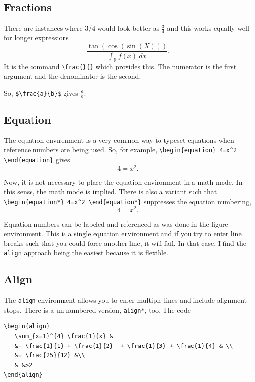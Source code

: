 \subsection*{Fractions}

There are instances where $3/4$ would look better as $\frac{3}{4}$ and this
works equally well for longer expressions $$ \frac{\tan\left(\cos\left(\sin (X)
    \right)\right)}{\int_{\mathbb{R}} f(x) ~ dx}.$$ It is the command
\verb!\frac{}{}! which provides this. The numerator is the first argument and
the denominator is the second.

So, \verb=$\frac{a}{b}$= gives $\frac{a}{b}$.

\subsection*{Equation}

The equation environment is a very common way to typeset equations
when reference numbers are being used. So, for example,
\verb!\begin{equation} 4=x^2 \end{equation}! gives
\begin{equation}
  4=x^2.
\end{equation}

Now, it is not necessary to place the equation environment in a math
mode. In this sense, the math mode is implied. There is also a variant
such that \verb!\begin{equation*} 4=x^2 \end{equation*}! suppresses
the equation numbering,
\begin{equation*}
  4=x^2.
\end{equation*}

Equation numbers can be labeled and referenced as was done in the figure
environment. This is a single equation environment and if you try to enter line
breaks such that you could force another line, it will fail. In that case, I
find the \texttt{align} approach being the easiest because it is flexible.

\subsection*{Align}

The \texttt{align} environment allows you to enter multiple lines and
include alignment stops. There is a un-numbered version,
\texttt{align*}, too. The code

\begin{lstlisting}
\begin{align}
   \sum_{x=1}^{4} \frac{1}{x} &
   &= \frac{1}{1} + \frac{1}{2}  + \frac{1}{3} + \frac{1}{4} & \\
   &= \frac{25}{12} &\\
   & &>2
\end{align}
\end{lstlisting}

